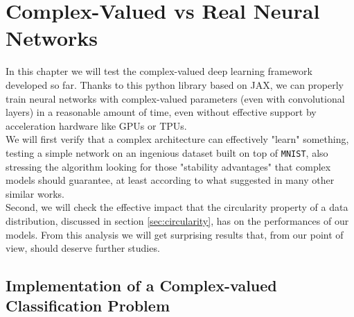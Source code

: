 \documentclass[../main.tex]{subfiles}
\begin{document}
	
\chapter{Complex-Valued vs Real Neural Networks}
\label{ch:cmplx_vs_real}

In this chapter we will test the complex-valued deep learning framework developed so far. Thanks to this python library based on JAX, we can properly train neural networks with complex-valued parameters (even with convolutional layers) in a reasonable amount of time, even without effective support by acceleration hardware like GPUs or TPUs.\\
We will first verify that a complex architecture can effectively "learn" something, testing a simple network on an ingenious dataset built on top of \texttt{MNIST}, also stressing the algorithm looking for those "stability advantages" that complex models should guarantee, at least according to what suggested in many other similar works.\\
Second, we will check the effective impact that the circularity property of a data distribution, discussed in section \ref{sec:circularity}, has on the performances of our models. From this analysis we will get surprising results that, from our point of view, should deserve further studies.

\section{Implementation of a Complex-valued Classification Problem}
\label{sec:phasemnist}
\end{document}
